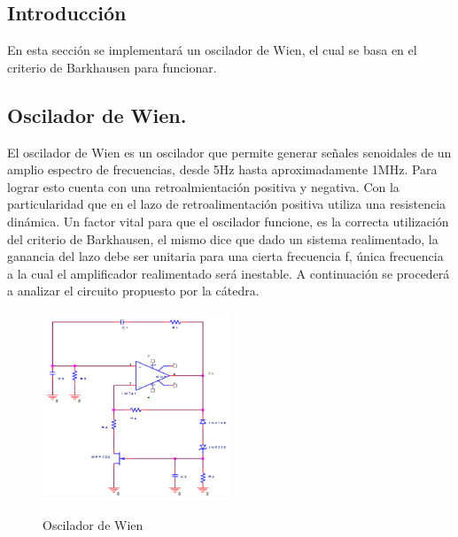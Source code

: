


\subsection{Introducción}
En esta sección se implementará un oscilador de Wien, el cual se basa en el criterio de Barkhausen para funcionar.
\subsection{Oscilador de Wien.}
El oscilador de Wien es un oscilador que permite generar señales senoidales de un amplio espectro de frecuencias, desde 5Hz hasta aproximadamente 1MHz.
Para lograr esto cuenta con una retroalmientación positiva y negativa. Con la particularidad que en el lazo de retroalimentación positiva utiliza una resistencia dinámica.
Un factor vital para que el oscilador funcione, es la correcta utilización del criterio de Barkhausen, el mismo dice que dado un sistema realimentado, la ganancia del lazo debe ser unitaria para una cierta frecuencia f, única frecuencia a la cual el amplificador realimentado será inestable.
A continuación se procederá a analizar el circuito propuesto por la cátedra.
\begin{figure}[H]
	\centering
	\includegraphics[width=0.5\textwidth]{Imagenes-Ej1/oscCatedra.PNG}
	\label{fig:cirosc}
	\caption{Oscilador de Wien}
\end{figure}

